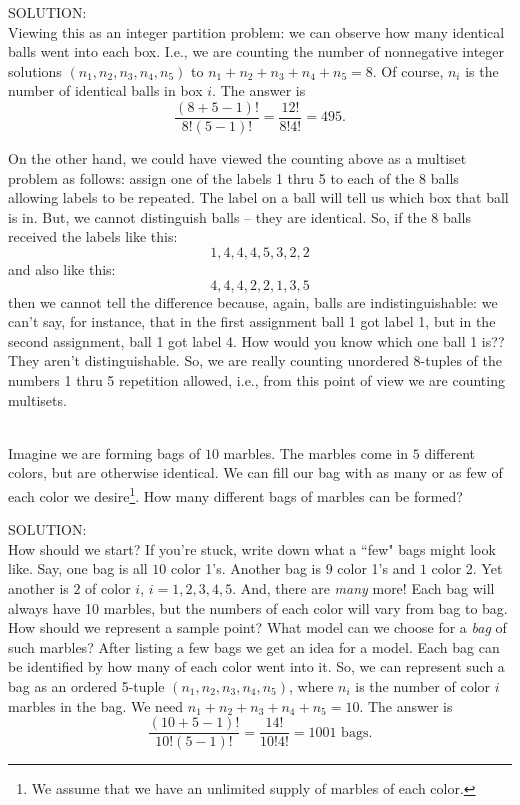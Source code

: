 \documentclass[12pt]{article}
\begin{document}
\noindent SOLUTION:  \\
Viewing this as an integer partition problem: we can observe how many identical balls went into each box.
I.e., we are counting the number of nonnegative integer solutions $(n_1,n_2,n_3,n_4,n_5)$ to $n_1+n_2+n_3+n_4+n_5=8$.
Of course, $n_i$ is the number of identical balls in box $i$. The answer is
$$\dfrac {(8+5-1)!}{8!(5-1)!} = \dfrac {12!}{8!4!} = 495.$$

\noindent On the other hand, we could have viewed the counting above as a multiset problem as follows:
assign one of the labels 1 thru 5 to each of the 8 balls allowing labels to be repeated. The label on a ball
will tell us which box that ball is in.  But, we cannot distinguish balls -- they are identical.  So, if the 8 balls received
the labels like this:
$$1,4,4,4,5,3,2,2$$
and also like this:
$$4,4,4,2,2,1,3,5$$
then we cannot tell the difference because, again, balls are indistinguishable: we can't say, for instance, that in the first assignment
ball 1 got label 1, but in the second assignment, ball 1 got label 4. How would you know which one ball 1 is?? They aren't distinguishable.
So, we are really counting unordered 8-tuples of the numbers 1 thru 5 repetition allowed, i.e., from this point of view we are counting multisets.\\









\newpage





\\
\noindent Imagine we are forming bags of $10$ marbles.
The marbles come in $5$ different colors, but are otherwise identical.
We can fill our bag with as many or as few of each color we desire\footnote{ We assume that we have an unlimited supply of marbles of each color.}.
How many different bags of marbles can be formed?\medskip

\noindent SOLUTION: \\
How should we start?  If you're stuck, write down what a ``few" bags might look like.
Say, one bag is all $10$ color 1's.
Another bag is $9$ color 1's and $1$ color 2.
Yet another is $2$ of color $i$, $i=1,2,3,4,5$.  And, there are {\em many}  more!
Each bag will always have 10 marbles, but the numbers of each color
will vary from bag to bag.
How should we represent a sample point?
What model can we choose for a {\em bag} of such marbles?
After listing a few bags we get an idea for a model. Each bag can be identified by how many of each color went into it.
So, we can represent such a bag as an ordered 5-tuple $(n_1,n_2,n_3,n_4,n_5)$, where $n_i$ is the number of color $i$ marbles in the bag.
We need $n_1+n_2+n_3+n_4+n_5 = 10$.  The answer is
$$\dfrac {(10 + 5-1)!}{10!(5-1)!} = \dfrac {14!}{10!4!} = 1001\mbox{ bags.}$$
\end{document}

